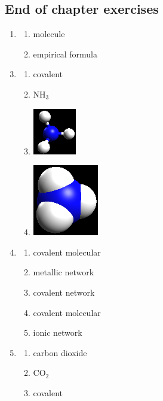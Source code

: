 \subsection{End of chapter exercises} 
\begin{multicols}{3}
\begin{enumerate}[noitemsep, label=\textbf{\arabic*}. ] 
\item %
    \begin{enumerate}[noitemsep, label=\textbf{(\alph*)} ]
  \item molecule
\item empirical formula
 \end{enumerate}
\end{enumerate}
\begin{enumerate}[noitemsep, label=\textbf{(\arabic*)} ]
\setcounter{enumi}{2}
\item %
    \begin{enumerate}[noitemsep, label=\textbf{(\alph*)} ]
 \item covalent
\item $\text{NH}_{3}$
\item \includegraphics[width=.1\textwidth]{photos/composition_ammonia_ballstick.png}
\item \includegraphics[width=.1\textwidth]{photos/composition_ammonia_spacefill.png}
\end{enumerate}
\item %
    \begin{enumerate}[noitemsep, label=\textbf{(\alph*)} ]
 \item covalent molecular
\item metallic network
\item covalent network
\item covalent molecular
\item ionic network
\end{enumerate}
\item %
    \begin{enumerate}[noitemsep, label=\textbf{(\alph*)} ]
 \item carbon dioxide
\item $\text{CO}_2$
\item covalent
\end{enumerate}
\end{enumerate}
\end{multicols}

